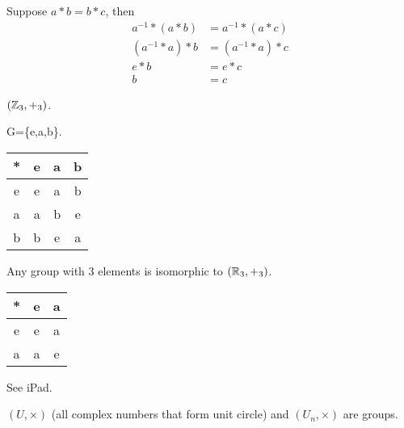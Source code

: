\documentclass[class=article,crop=false]{standalone}
\begin{document}
\begin{prf}
	Suppose $a*b=b*c$, then
	\begin{align*}
		a^{-1}*(a*b) &=a^{-1} * (a*c)\\
		(a^{-1}*a)*b &= (a^{-1}*a)*c \\
		e*b&= e* c \\
		b&=c
	\end{align*}
\end{prf}

\begin{eg}
	$(\mathbb{Z}_3,+_3)$.

	G=\{e,a,b\}.
\begin{table}[htpb]
	\centering
	\begin{tabular}{c||c|c|c}
		*&e&a&b\\
		\hline
		e&e&a&b\\
		\hline
		a&a&b&e\\
		\hline
		b&b&e&a\\
	\end{tabular}
\end{table}

\begin{remark}
	Any group with 3 elements is isomorphic to $(\mathbb{R}_3,+_3)$.
\end{remark}
\end{eg}
\begin{eg}
\begin{table}[htpb]
	\centering
	\begin{tabular}{c||c|c}
		*&e&a\\
		\hline
		e&e&a\\
		\hline
		a&a&e
	\end{tabular}
\end{table}
\end{eg}

\begin{eg}
See iPad.
\end{eg}

\begin{eg}[]
	$(U,\times )$ (all complex numbers that form unit circle) and $(U_n,\times )$ are groups.
\end{eg}
\end{document}
